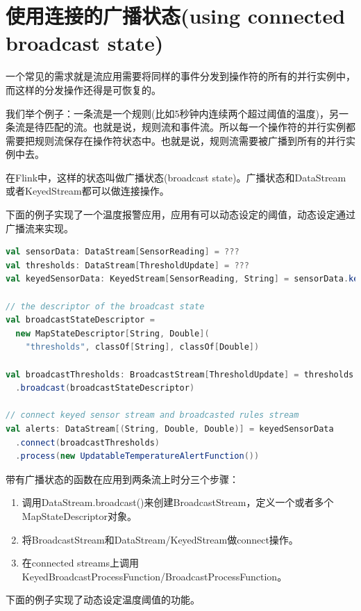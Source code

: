 \documentclass[oneside]{ctexbook}
\begin{document}
\section{使用连接的广播状态(using connected broadcast state)}

一个常见的需求就是流应用需要将同样的事件分发到操作符的所有的并行实例中，而这样的分发操作还得是可恢复的。

我们举个例子：一条流是一个规则(比如5秒钟内连续两个超过阈值的温度)，另一条流是待匹配的流。也就是说，规则流和事件流。所以每一个操作符的并行实例都需要把规则流保存在操作符状态中。也就是说，规则流需要被广播到所有的并行实例中去。

在Flink中，这样的状态叫做广播状态(broadcast state)。广播状态和DataStream或者KeyedStream都可以做连接操作。

下面的例子实现了一个温度报警应用，应用有可以动态设定的阈值，动态设定通过广播流来实现。

\begin{lstlisting}[language=scala]
val sensorData: DataStream[SensorReading] = ???
val thresholds: DataStream[ThresholdUpdate] = ???
val keyedSensorData: KeyedStream[SensorReading, String] = sensorData.keyBy(_.id)

// the descriptor of the broadcast state
val broadcastStateDescriptor =
  new MapStateDescriptor[String, Double](
    "thresholds", classOf[String], classOf[Double])

val broadcastThresholds: BroadcastStream[ThresholdUpdate] = thresholds
  .broadcast(broadcastStateDescriptor)

// connect keyed sensor stream and broadcasted rules stream
val alerts: DataStream[(String, Double, Double)] = keyedSensorData
  .connect(broadcastThresholds)
  .process(new UpdatableTemperatureAlertFunction())
\end{lstlisting}

带有广播状态的函数在应用到两条流上时分三个步骤：

\begin{enumerate}
  \item 调用DataStream.broadcast()来创建BroadcastStream，定义一个或者多个MapStateDescriptor对象。
  \item 将BroadcastStream和DataStream/KeyedStream做connect操作。
  \item 在connected streams上调用KeyedBroadcastProcessFunction/BroadcastProcessFunction。
\end{enumerate}

下面的例子实现了动态设定温度阈值的功能。
\end{document}
